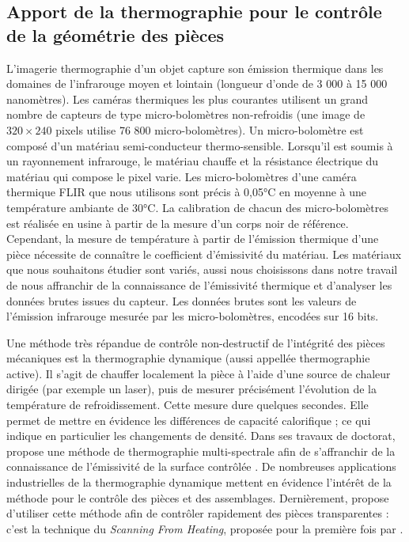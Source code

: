 \subsection{Apport de la thermographie pour le contrôle de la géométrie des pièces} \label{subsec:thermography}
L'imagerie thermographie d'un objet capture son émission thermique dans les domaines de l'infrarouge moyen et lointain (longueur d'onde de 3 000 à 15 000 nanomètres).
Les caméras thermiques les plus courantes utilisent un grand nombre de capteurs de type micro-bolomètres non-refroidis (une image de $320\times 240$ pixels utilise 76 800 micro-bolomètres).
Un micro-bolomètre est composé d'un matériau semi-conducteur thermo-sensible.
Lorsqu'il est soumis à un rayonnement infrarouge, le matériau chauffe et la résistance électrique du matériau qui compose le pixel varie.  %
Les micro-bolomètres d'une caméra thermique FLIR que nous utilisons sont précis à 0,05°C en moyenne à une température ambiante de 30°C.
La calibration de chacun des micro-bolomètres est réalisée en usine à partir de la mesure d'un corps noir de référence.
Cependant, la mesure de température à partir de l'émission thermique d'une pièce nécessite de connaître le coefficient d'émissivité du matériau.
Les matériaux que nous souhaitons étudier sont variés, aussi nous choisissons dans notre travail de nous affranchir de la connaissance de l'émissivité thermique et d'analyser les données brutes issues du capteur.
Les données brutes sont les valeurs de l'émission infrarouge mesurée par les micro-bolomètres, encodées sur 16 bits.

Une méthode très répandue de contrôle non-destructif de l'intégrité des pièces mécaniques est la thermographie dynamique (aussi appellée thermographie active).
Il s'agit de chauffer localement la pièce à l'aide d'une source de chaleur dirigée (par exemple un laser), puis de mesurer précisément l'évolution de la température de refroidissement.
Cette mesure dure quelques secondes.
Elle permet de mettre en évidence les différences de capacité calorifique ; ce qui indique en particulier les changements de densité.  %
Dans ses travaux de doctorat, \citeauthor{legrand_thermographie_2002} propose une méthode de thermographie multi-spectrale afin de s'affranchir de la connaissance de l'émissivité de la surface contrôlée \cite{legrand_thermographie_2002}.
De nombreuses applications industrielles de la thermographie dynamique mettent en évidence l'intérêt de la méthode pour le contrôle des pièces et des assemblages.
Dernièrement, \citeauthor{herrmann_cracks_2019} propose d'utiliser cette méthode afin de contrôler rapidement des pièces transparentes \cite{herrmann_cracks_2019} : c'est la technique du \textit{Scanning From Heating}, proposée pour la première fois par \citeauthor{eren_scanning_2009} \cite{eren_scanning_2009} .

